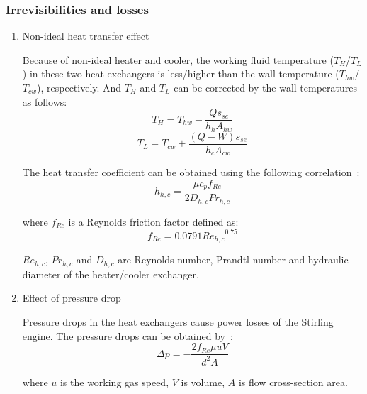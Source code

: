 
\subsubsection{Irrevisibilities and losses}

\begin{enumerate}[label=(\arabic*)]
\item Non-ideal heat transfer effect

Because of non-ideal heater and cooler, the working fluid temperature ($T_{H}$/$T_L$) in these two heat exchangers is less/higher than the wall temperature ($T_{hw}$/$T_{cw}$), respectively. And $T_{H}$ and $T_{L}$ can be corrected by the wall temperatures as follows:
\begin{equation}
	T_H = T_{hw} - \frac{Qs_{se}}{h_hA_{hw}}
	\label{eq:T_H}
\end{equation}
\begin{equation}
	T_L = T_{cw} + \frac{(Q-W)s_{se}}{h_cA_{cw}}
	\label{eq:T_L}
\end{equation}

The heat transfer coefficient can be obtained using the following correlation~\cite{Babaelahi2015}:
\begin{equation}
	h_{h,c} = \frac{\mu c_pf_{Re}}{2D_{h,c}Pr_{h,c}}
\end{equation}

where $f_{Re}$ is a Reynolds friction factor defined as:
\begin{equation}
	f_{Re} = 0.0791{Re_{h,c}}^{0.75}
\end{equation}

$Re_{h,c}$, $Pr_{h,c}$ and $D_{h,c}$ are Reynolds number, Prandtl number and hydraulic diameter of the heater/cooler exchanger.

\item Effect of pressure drop

Pressure drops in the heat exchangers cause power losses of the Stirling engine. The pressure drops can be obtained by~\cite{Urieli1984}:
\begin{equation}
	\Delta p = -\frac{2f_{Re}\mu u V}{d^2A}
\end{equation}

where $u$ is the working gas speed, $V$ is volume, $A$ is flow cross-section area.


\end{enumerate}
